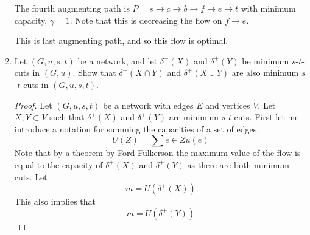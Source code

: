 \documentclass[11pt, oneside]{article}
\begin{document}
\begin{enumerate}
    The fourth augmenting path is $P = s \to c \to b \to f \to e \to t$ with
    minimum capacity, $\gamma = 1$.
    Note that this is decreasing the flow on $f \to e$.
    \begin{center}
    \end{center}
    This is last augmenting path, and so this flow is optimal.

  \item %
    Let $(G, u, s, t)$ be a network, and let $\delta^+(X)$ and $\delta^+(Y)$ be
    minimum $s$-$t$-cuts in $(G,u)$.
    Show that $\delta^+(X\cap Y)$ and $\delta^+(X \cup Y)$ are also minimum
    $s$-$t$-cuts in $(G, u, s, t)$.

    \begin{proof}
      Let $(G, u, s, t)$ be a network with edges $E$ and vertices $V$.
      Let $X, Y \subset V$ such that $\delta^+(X)$ and $\delta^+(Y)$ are minimum
      $s$-$t$ cuts.
      First let me introduce a notation for summing the capacities of a set
      of edges.
      \[
        U(Z) = \sum{e \in Z}{}{u(e)}
      \]
      Note that by a theorem by Ford-Fulkerson the maximum value of the flow is
      equal to the capacity of $\delta^+(X)$ and $\delta^+(Y)$ as there are both
      minimum cuts.
      Let
      \[
        m = U(\delta^+(X))
      \]
      This also implies that
      \[
        m = U(\delta^+(Y))
      \]


\end{proof}
\end{enumerate}
\end{document}
